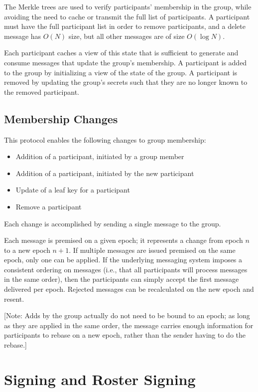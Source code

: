 \documentclass[11pt, oneside]{article}
\begin{document}
The Merkle trees are used to verify participants' membership in the group, while avoiding the need to cache or transmit the full list of participants.  A participant must have the full participant list in order to remove participants, and a delete message has $O(N)$ size, but all other messages are of size $O(\log N)$.

Each participant caches a view of this state that is sufficient to generate and consume messages that update the group's membership.  A participant is added to the group by initializing a view of the state of the group.  A participant is removed by updating the group's secrets such that they are no longer known to the removed participant.


\subsection{Membership Changes}

This protocol enables the following changes to group membership:

\begin{itemize}
\item{Addition of a participant, initiated by a group member}
\item{Addition of a participant, initiated by the new participant}
\item{Update of a leaf key for a participant}
\item{Remove a participant}
\end{itemize}

Each change is accomplished by sending a single message to the group.  

Each message is premised on a given epoch; it represents a change from epoch $n$ to a new epoch $n+1$.  If multiple messages are issued premised on the same epoch, only one can be applied.  If the underlying messaging system imposes a consistent ordering on messages (i.e., that all participants will process messages in the same order), then the participants can simply accept the first message delivered per epoch.  Rejected messages can be recalculated on the new epoch and resent.  

[Note: Adds by the group actually do not need to be bound to an epoch; as long as they are applied in the same order, the message carries enough information for participants to rebase on a new epoch, rather than the sender having to do the rebase.]


\section{Signing and Roster Signing}
\end{document}
